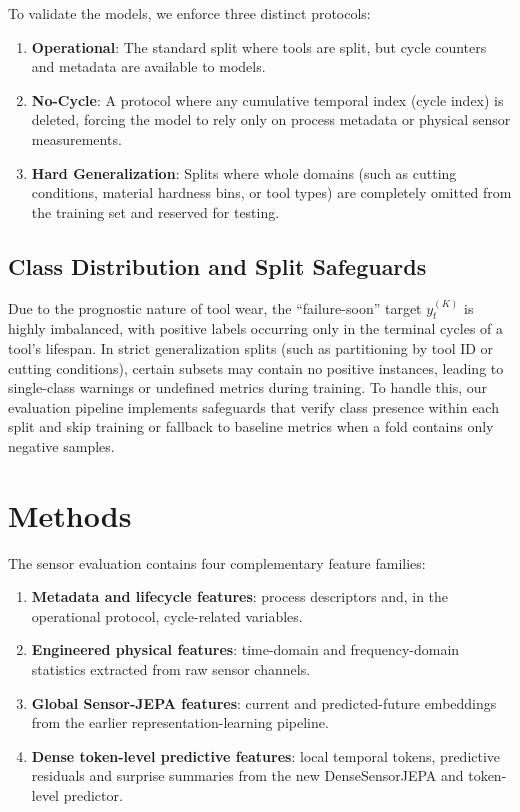 \documentclass[10pt,journal,compsoc]{IEEEtran}
\begin{document}
To validate the models, we enforce three distinct protocols:
\begin{enumerate}
    \item \textbf{Operational}: The standard split where tools are split, but cycle counters and metadata are available to models.
    \item \textbf{No-Cycle}: A protocol where any cumulative temporal index (cycle index) is deleted, forcing the model to rely only on process metadata or physical sensor measurements.
    \item \textbf{Hard Generalization}: Splits where whole domains (such as cutting conditions, material hardness bins, or tool types) are completely omitted from the training set and reserved for testing.
\end{enumerate}

\subsection{Class Distribution and Split Safeguards}
Due to the prognostic nature of tool wear, the ``failure-soon'' target $y_t^{(K)}$ is highly imbalanced, with positive labels occurring only in the terminal cycles of a tool's lifespan. In strict generalization splits (such as partitioning by tool ID or cutting conditions), certain subsets may contain no positive instances, leading to single-class warnings or undefined metrics during training. To handle this, our evaluation pipeline implements safeguards that verify class presence within each split and skip training or fallback to baseline metrics when a fold contains only negative samples.

\section{Methods}
The sensor evaluation contains four complementary feature families:
\begin{enumerate}
    \item \textbf{Metadata and lifecycle features}: process descriptors and, in the operational protocol, cycle-related variables.
    \item \textbf{Engineered physical features}: time-domain and frequency-domain statistics extracted from raw sensor channels.
    \item \textbf{Global Sensor-JEPA features}: current and predicted-future embeddings from the earlier representation-learning pipeline.
    \item \textbf{Dense token-level predictive features}: local temporal tokens, predictive residuals and surprise summaries from the new DenseSensorJEPA and token-level predictor.
\end{enumerate}
\end{document}
